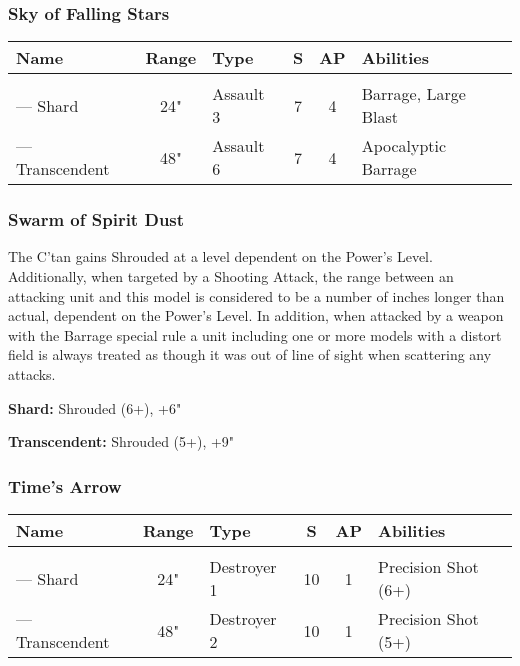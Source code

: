 \subsubsection{Sky of Falling Stars} \label{Sky of Falling Stars}

\noindent
\begin{NiceTabular}{L{115 pt} c C{40pt} *{2}{c} >{\raggedright\arraybackslash}p{240pt}}
	Name & Range & Type & S & AP & Abilities \\
	\hline
	 &  &  &  &  & \\
	— Shard  & 24" & Assault 3 & 7 & 4 & Barrage, Large Blast \\
	 — Transcendent & 48" & Assault 6 & 7 & 4 & Apocalyptic Barrage \\
\end{NiceTabular}

\subsubsection{Swarm of Spirit Dust} \label{Swarm of Spirit Dust}

The C'tan gains Shrouded at a level dependent on the Power's Level. Additionally, when targeted by a Shooting Attack, the range between an attacking unit and this model is considered to be a number of inches longer than actual, dependent on the Power's Level. In addition, when attacked by a weapon with the Barrage special rule a unit including one or more models with a distort field is always treated as though it was out of line of sight when scattering any attacks.

\textbf{Shard:} Shrouded (6+), +6"

\textbf{Transcendent:} Shrouded (5+), +9"

\subsubsection{Time's Arrow} \label{Time's Arrow}

\noindent
\begin{NiceTabular}{L{115 pt} c C{40pt} *{2}{c} >{\raggedright\arraybackslash}p{240pt}}
	Name & Range & Type & S & AP & Abilities \\
	\hline
	 &  &  &  &  & \\
	— Shard & 24" & Destroyer 1 & 10 & 1 & Precision Shot (6+) \\
	 — Transcendent & 48" & Destroyer 2 & 10 & 1 & Precision Shot (5+) \\
\end{NiceTabular}

